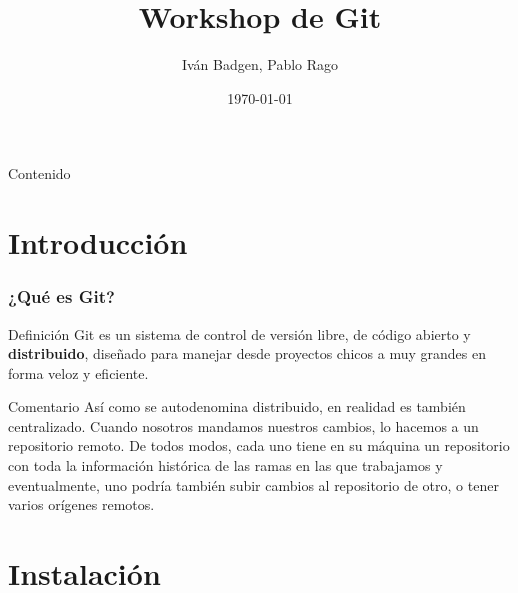 \documentclass{beamer}
\begin{document}
\title{Workshop de Git}  
\author{Iván Badgen, Pablo Rago}
\date{\today} 

\begin{frame}
\titlepage
\end{frame}

\begin{frame}{Contenido}
\begin{multicols}{2}
\tableofcontents
\end{multicols}
\end{frame}

\section{Introducción} 

\begin{frame}\frametitle{¿Qué es Git?} 
  \begin{block}{Definición}
    Git es un sistema de control de versión libre, de código abierto y \textbf{distribuido}, diseñado
    para manejar desde proyectos chicos a muy grandes en forma veloz y eficiente. \footnotemark
  \end{block} \pause
  
  \begin{block}{Comentario}
    Así como se autodenomina distribuido, en realidad es también centralizado. Cuando nosotros mandamos nuestros cambios,
    lo hacemos a un repositorio remoto. De todos modos, cada uno tiene en su máquina un repositorio con toda la información
    histórica de las ramas en las que trabajamos y eventualmente, uno podría también subir cambios al repositorio
    de otro, o tener varios orígenes remotos.
  \end{block}
\end{frame}

\section{Instalación}
\end{document}

